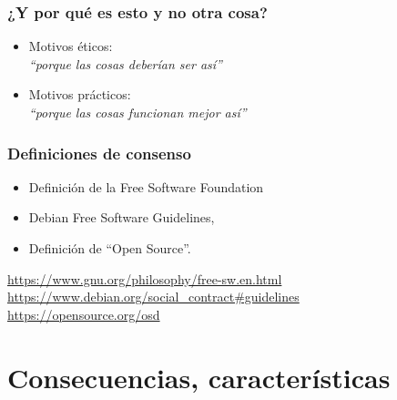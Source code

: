 \documentclass[17pt,aspectratio=169]{beamer}
\begin{document}

\begin{frame}
\frametitle{¿Y por qué es esto y no otra cosa?}

\begin{itemize}
\item Motivos éticos: \\
  {\em ``porque las cosas deberían ser así''} \\
\item Motivos prácticos: \\
  {\em ``porque las cosas funcionan mejor así''} \\
\end{itemize}

\end{frame}


\begin{frame}
\frametitle{Definiciones de consenso}

\begin{itemize}
\item Definición de la Free Software Foundation
\item Debian Free Software Guidelines, 
\item Definición de ``Open Source''.
\end{itemize}

\begin{flushright}
{\footnotesize
  \url{https://www.gnu.org/philosophy/free-sw.en.html} \\
  \url{https://www.debian.org/social_contract\#guidelines} \\ 
  \url{https://opensource.org/osd} \\
}
\end{flushright}

\end{frame}

\section{Consecuencias, características}

\end{document}
